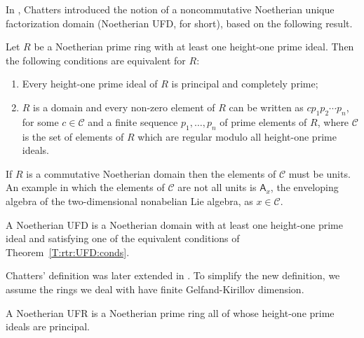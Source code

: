 \documentclass{commat}
\newcommand{\A}{\mathsf{A}}
\begin{document}
In \cite{aC84}, Chatters  introduced the notion of a noncommutative Noetherian unique factorization domain (Noetherian UFD, for short), based on the following result.

\begin{theorem}\label{T:rtr:UFD:conds}
	Let $R$ be a  Noetherian prime ring with at least one height-one prime ideal. Then the following conditions are equivalent for $R$:
	\begin{enumerate}
		\item Every height-one prime ideal of $R$ is principal and completely prime;
		\item $R$ is a domain and every non-zero element of $R$ can be written as $cp_1 p_2 \cdots p_n$, for some $c\in \mathcal{C}$ and a finite sequence  $p_1,  \ldots, p_n$ of prime elements of $R$, where  $\mathcal{C}$ is the set of elements of $R$ which are regular modulo all height-one prime ideals. 
	\end{enumerate} 
\end{theorem}

If $R$ is a commutative Noetherian domain then the elements of $\mathcal{C}$ must be units. An example in which the elements of $\mathcal{C}$ are not all units is $\A_x$, the enveloping algebra of the two-dimensional nonabelian Lie algebra, as $x\in\mathcal{C}$.

\begin{definition}
	A Noetherian UFD is a Noetherian domain with at least one height-one prime ideal and satisfying one of the equivalent conditions of Theorem~\ref{T:rtr:UFD:conds}. 
\end{definition}


Chatters' definition was later extended in \cite{CJ86}. To simplify the new definition, we assume the rings we deal with have finite  Gelfand-Kirillov dimension.

\begin{definition}
	A Noetherian UFR is a Noetherian prime ring all of whose height-one prime ideals are principal. 
\end{definition}
\end{document}
